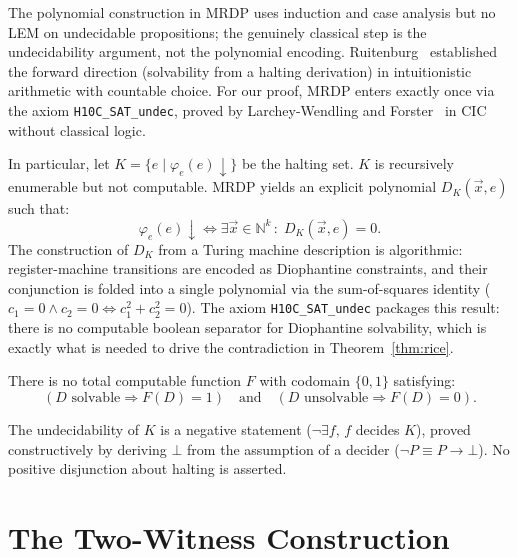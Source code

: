 \documentclass{lmcs}
\begin{document}
\begin{rem}
The polynomial construction in MRDP uses induction and case analysis
but no LEM on undecidable propositions; the genuinely classical step
is the undecidability argument, not the polynomial encoding.
Ruitenburg~\cite{ruitenburg1985} established the forward direction
(solvability from a halting derivation) in intuitionistic arithmetic
with countable choice.
For our proof, MRDP enters exactly once via the axiom
\texttt{H10C\_SAT\_undec}, proved by Larchey-Wendling and
Forster~\cite{larchey2022} in CIC without classical logic.
\end{rem}

In particular, let \(K = \{e \mid \varphi_e(e)\!\downarrow\}\) be the halting
set. \(K\) is recursively enumerable but not computable. MRDP yields an explicit
polynomial \(D_K(\vec{x}, e)\) such that:
\[
  \varphi_e(e)\!\downarrow \iff \exists \vec{x} \in \mathbb{N}^k\,:\;
  D_K(\vec{x}, e) = 0.
\]
The construction of \(D_K\) from a Turing machine description is
algorithmic: register-machine transitions are encoded as Diophantine
constraints, and their conjunction is folded into a single polynomial
via the sum-of-squares identity (\(c_1 = 0 \wedge c_2 = 0 \iff
c_1^2 + c_2^2 = 0\)). The axiom \texttt{H10C\_SAT\_undec} packages
this result: there is no computable boolean separator for Diophantine
solvability, which is exactly what is needed to drive the contradiction
in Theorem~\ref{thm:rice}.

\begin{cor}
\label{cor:mrdp}
There is no total computable function \(F\) with codomain \(\{0,1\}\) satisfying:
\[
  (\text{$D$ solvable} \Rightarrow F(D) = 1) \quad \text{and} \quad
  (\text{$D$ unsolvable} \Rightarrow F(D) = 0).
\]
\end{cor}

\begin{rem}
The undecidability of $K$ is a negative statement
($\neg\exists f,\, f$ decides $K$), proved constructively by deriving
$\bot$ from the assumption of a decider ($\neg P \equiv P \to \bot$).
No positive disjunction about halting is asserted.
\end{rem}

\section{The Two-Witness Construction}
\label{sec:construction}
\end{document}
